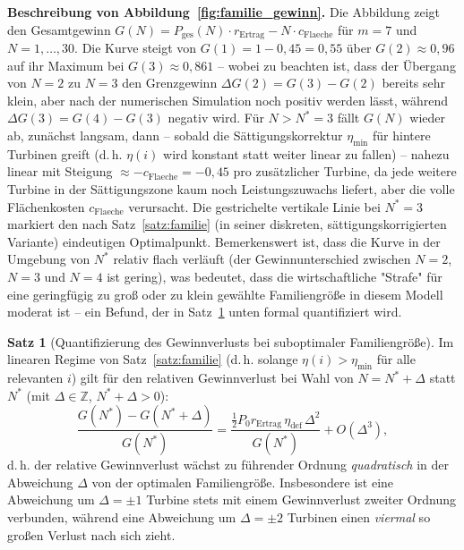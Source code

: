 ﻿\documentclass[a4paper,12pt]{article}
\theoremstyle{definition}
\newtheorem{satz}{Satz}
\begin{document}
\textbf{Beschreibung von Abbildung~\ref{fig:familie_gewinn}.}
Die Abbildung zeigt den Gesamtgewinn $G(N)=P_{\mathrm{ges}}(N)\cdot r_{\mathrm{Ertrag}} - N\cdot c_{\mathrm{Flaeche}}$ für $m=7$ und $N=1,\ldots,30$. Die Kurve steigt von $G(1)=1-0{,}45=0{,}55$ über $G(2)\approx0{,}96$ auf ihr Maximum bei $G(3)\approx0{,}861$ -- wobei zu beachten ist, dass der Übergang von $N=2$ zu $N=3$ den Grenzgewinn $\Delta G(2)=G(3)-G(2)$ bereits sehr klein, aber nach der numerischen Simulation noch positiv werden lässt, während $\Delta G(3)=G(4)-G(3)$ negativ wird. Für $N>N^*=3$ fällt $G(N)$ wieder ab, zunächst langsam, dann -- sobald die Sättigungskorrektur $\eta_{\min}$ für hintere Turbinen greift (d.\,h. $\eta(i)$ wird konstant statt weiter linear zu fallen) -- nahezu linear mit Steigung $\approx-c_{\mathrm{Flaeche}}=-0{,}45$ pro zusätzlicher Turbine, da jede weitere Turbine in der Sättigungszone kaum noch Leistungszuwachs liefert, aber die volle Flächenkosten $c_{\mathrm{Flaeche}}$ verursacht. Die gestrichelte vertikale Linie bei $N^*=3$ markiert den nach Satz~\ref{satz:familie} (in seiner diskreten, sättigungskorrigierten Variante) eindeutigen Optimalpunkt. Bemerkenswert ist, dass die Kurve in der Umgebung von $N^*$ relativ flach verläuft (der Gewinnunterschied zwischen $N=2$, $N=3$ und $N=4$ ist gering), was bedeutet, dass die wirtschaftliche "Strafe" für eine geringfügig zu groß oder zu klein gewählte Familiengröße in diesem Modell moderat ist -- ein Befund, der in Satz~\ref{satz:familie_robustheit} unten formal quantifiziert wird.

\begin{satz}[Quantifizierung des Gewinnverlusts bei suboptimaler Familiengröße]
\label{satz:familie_robustheit}
Im linearen Regime von Satz~\ref{satz:familie} (d.\,h. solange $\eta(i)>\eta_{\min}$ für alle relevanten $i$) gilt für den relativen Gewinnverlust bei Wahl von $N=N^*+\Delta$ statt $N^*$ (mit $\Delta\in\mathbb{Z}$, $N^*+\Delta>0$):
\[
\frac{G(N^*)-G(N^*+\Delta)}{G(N^*)} = \frac{\tfrac{1}{2}P_0 r_{\mathrm{Ertrag}}\,\eta_{\mathrm{def}}\,\Delta^2}{G(N^*)} + O(\Delta^3),
\]
d.\,h. der relative Gewinnverlust wächst zu führender Ordnung \emph{quadratisch} in der Abweichung $\Delta$ von der optimalen Familiengröße. Insbesondere ist eine Abweichung um $\Delta=\pm1$ Turbine stets mit einem Gewinnverlust zweiter Ordnung verbunden, während eine Abweichung um $\Delta=\pm2$ Turbinen einen \emph{viermal} so großen Verlust nach sich zieht.
\end{satz}
\end{document}
